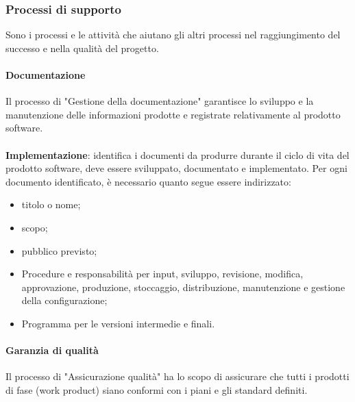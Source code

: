 \subsubsection{Processi di supporto}
Sono i processi e le attività che aiutano gli altri processi nel raggiungimento del successo e nella qualità del progetto.

\paragraph{Documentazione}
Il processo di "Gestione della documentazione" garantisce lo sviluppo e la manutenzione delle informazioni prodotte e registrate relativamente al prodotto software. \\ \\
\textbf{Implementazione}: identifica i documenti da produrre durante il ciclo di vita del prodotto software,
deve essere sviluppato, documentato e implementato. Per ogni documento identificato, è necessario quanto segue
essere indirizzato:
\begin{itemize}
    \item titolo o nome;
    \item scopo;
    \item pubblico previsto;
    \item Procedure e responsabilità per input, sviluppo, revisione, modifica, approvazione, produzione, stoccaggio, distribuzione, manutenzione e gestione della configurazione;
    \item Programma per le versioni intermedie e finali.
\end{itemize}

\paragraph{Garanzia di qualità}
Il processo di "Assicurazione qualità" ha lo scopo di assicurare che tutti i prodotti di fase (work product) siano conformi con i piani e gli standard definiti.
